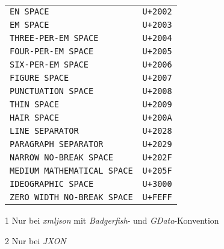 \begin{figure}[h!]
\begin{center}
\begin{threeparttable}
\begin{tabular}{lr}
            \rowcolor{rubgray!50}\texttt{EN SPACE}                           & \texttt{U+2002}\\
                                 \texttt{EM SPACE}                           & \texttt{U+2003}\\
            \rowcolor{rubgray!50}\texttt{THREE-PER-EM SPACE}                 & \texttt{U+2004}\\
                                 \texttt{FOUR-PER-EM SPACE}                  & \texttt{U+2005}\\
            \rowcolor{rubgray!50}\texttt{SIX-PER-EM SPACE}                   & \texttt{U+2006}\\
                                 \texttt{FIGURE SPACE}                       & \texttt{U+2007}\\
            \rowcolor{rubgray!50}\texttt{PUNCTUATION SPACE}                  & \texttt{U+2008}\\
                                 \texttt{THIN SPACE}                         & \texttt{U+2009}\\
            \rowcolor{rubgray!50}\texttt{HAIR SPACE}                         & \texttt{U+200A}\\
                                 \texttt{LINE SEPARATOR}                     & \texttt{U+2028}\\
            \rowcolor{rubgray!50}\texttt{PARAGRAPH SEPARATOR}                & \texttt{U+2029}\\
                                 \texttt{NARROW NO-BREAK SPACE}              & \texttt{U+202F}\\
            \rowcolor{rubgray!50}\texttt{MEDIUM MATHEMATICAL SPACE}          & \texttt{U+205F}\\
                                 \texttt{IDEOGRAPHIC SPACE}                  & \texttt{U+3000}\\
            \rowcolor{rubgray!50}\texttt{ZERO WIDTH NO-BREAK SPACE}\tnote{2} & \texttt{U+FEFF}\\
            \bottomrule
            \end{tabular}
            \begin{tablenotes}
                \item[1] Nur bei \emph{xmljson} mit \emph{Badgerfish}- und \emph{GData}-Konvention
                \item[2] Nur bei \emph{JXON}
            \end{tablenotes}
        \end{threeparttable}
        \endgroup
    \end{center}
\end{figure}

